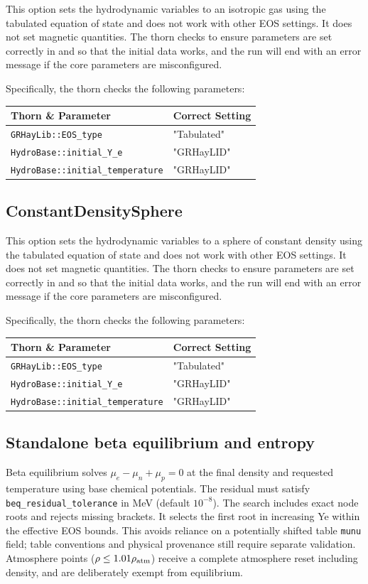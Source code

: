 \documentclass{article}
\begin{document}
This option sets the hydrodynamic variables to an isotropic gas using
the tabulated equation of state and does not work with other EOS
settings. It does not set magnetic quantities. The thorn checks to
ensure parameters are set correctly in \glib and
\hbase so that the initial data works, and the run will end
with an error message if the core parameters are misconfigured.

Specifically, the thorn checks the following parameters:
\begin{tabular}{l|l}
Thorn \& Parameter & Correct Setting \\\hline
\texttt{GRHayLib::EOS\_type} & "Tabulated" \\
\texttt{HydroBase::initial\_Y\_e} & "GRHayLID" \\
\texttt{HydroBase::initial\_temperature} & "GRHayLID"
\end{tabular}

\subsection{ConstantDensitySphere}

This option sets the hydrodynamic variables to a sphere of constant
density using the tabulated equation of state and does not work
with other EOS settings. It does not set magnetic quantities. The thorn
checks to ensure parameters are set correctly in \glib and
\hbase so that the initial data works, and the run will end
with an error message if the core parameters are misconfigured.

Specifically, the thorn checks the following parameters:
\begin{tabular}{l|l}
Thorn \& Parameter & Correct Setting \\\hline
\texttt{GRHayLib::EOS\_type} & "Tabulated" \\
\texttt{HydroBase::initial\_Y\_e} & "GRHayLID" \\
\texttt{HydroBase::initial\_temperature} & "GRHayLID"
\end{tabular}

\subsection{Standalone beta equilibrium and entropy}

Beta equilibrium solves $\mu_e-\mu_n+\mu_p=0$ at the final density and
requested temperature using base chemical potentials. The residual must
satisfy \texttt{beq\_residual\_tolerance} in MeV (default $10^{-8}$).
The search includes exact node roots and rejects missing brackets. It selects
the first root in increasing Ye within the effective EOS bounds. This avoids
reliance on a potentially shifted table \texttt{munu} field; table conventions
and physical provenance still require separate validation. Atmosphere points
($\rho\leq1.01\rho_{\rm atm}$) receive a complete atmosphere reset including
density, and are deliberately exempt from equilibrium.
\end{document}
